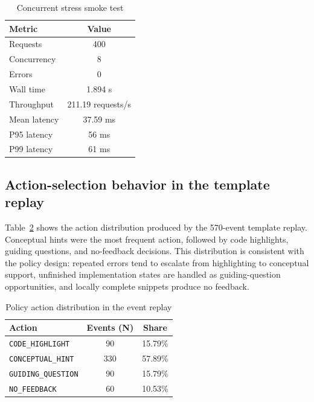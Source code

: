 \documentclass[11pt]{article}
\begin{document}
\begin{table}[htbp]
\centering
\caption{Concurrent stress smoke test}
\label{tab:stress_results}
\renewcommand{\arraystretch}{1.15}
\begin{tabular}{lc}
\toprule
\textbf{Metric} & \textbf{Value} \\
\midrule
Requests & 400 \\
Concurrency & 8 \\
Errors & 0 \\
Wall time & 1.894 s \\
Throughput & 211.19 requests/s \\
Mean latency & 37.59 ms \\
P95 latency & 56 ms \\
P99 latency & 61 ms \\
\bottomrule
\end{tabular}
\end{table}

\subsection{Action-selection behavior in the template replay}

Table~\ref{tab:action_distribution} shows the action distribution produced by the 570-event template replay. Conceptual hints were the most frequent action, followed by code highlights, guiding questions, and no-feedback decisions. This distribution is consistent with the policy design: repeated errors tend to escalate from highlighting to conceptual support, unfinished implementation states are handled as guiding-question opportunities, and locally complete snippets produce no feedback.

\begin{table}[htbp]
\centering
\caption{Policy action distribution in the event replay}
\label{tab:action_distribution}
\renewcommand{\arraystretch}{1.15}
\begin{tabular}{lcc}
\toprule
\textbf{Action} & \textbf{Events (N)} & \textbf{Share} \\
\midrule
\texttt{CODE\_HIGHLIGHT} & 90 & 15.79\% \\
\texttt{CONCEPTUAL\_HINT} & 330 & 57.89\% \\
\texttt{GUIDING\_QUESTION} & 90 & 15.79\% \\
\texttt{NO\_FEEDBACK} & 60 & 10.53\% \\
\bottomrule
\end{tabular}
\end{table}
\end{document}
